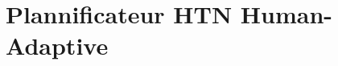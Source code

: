 \documentclass[a4paper,11pt,twoside]{StyleThese}
\begin{document}





\section{Plannificateur HTN Human-Adaptive}
\label{sec:planning}

\end{document}
